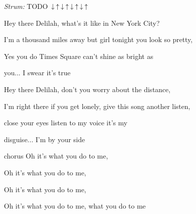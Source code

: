 \begin{song}


 \quad
\textit{Strum:} TODO $\Down\Up\Down\Up\Down\Up\Down\Up$

\large

\begin{chordbox}
\par
{}\par
{}\par
{}\par
{}\par
\end{chordbox}

\large

\bigskip

     \par

\bigskip

 Hey there Delilah, what's it like in New York City? \par
I'm a thousand miles away but girl tonight you look so pretty, \par
Yes you do  Times Square can't shine as bright as \par
{}you... I swear it's true \par

\bigskip

 Hey there Delilah, don't you worry about the distance, \par
I'm right there if you get lonely, give this song another listen, \par
close your eyes listen to my voice it's my \par
disguise... I'm by your side \par

\bigskip

\begin{chorusbox}{chorus}
Oh it's what you do to me, \par
{}Oh it's what you do to me, \par
{}Oh it's what you do to me, \par
{}Oh it's what you do to me, what you  do to me \par
\end{chorusbox}


\end{song}
